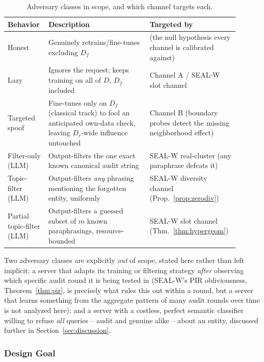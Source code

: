 \documentclass[10pt,journal,compsoc]{IEEEtran}
\begin{document}
\begin{table}[t]
\centering
\caption{Adversary classes in scope, and which channel targets each.}
\label{tab:threatmodel}
\begin{tabular}{@{}p{0.16\linewidth}p{0.42\linewidth}p{0.32\linewidth}@{}}
\toprule
Behavior & Description & Targeted by \\
\midrule
Honest & Genuinely retrains/fine-tunes excluding $D_f$ & (the null hypothesis every channel is calibrated against) \\
Lazy & Ignores the request; keeps training on all of $D$, $D_f$ included & Channel A / SEAL-W slot channel \\
Targeted spoof & Fine-tunes only on $D_f$ (classical track) to fool an anticipated own-data check, leaving $D_r$-wide influence untouched & Channel B (boundary probes detect the missing neighborhood effect) \\
Filter-only (LLM) & Output-filters the one exact known canonical audit string & SEAL-W real-cluster (any paraphrase defeats it) \\
Topic-filter (LLM) & Output-filters \emph{any} phrasing mentioning the forgotten entity, uniformly & SEAL-W diversity channel (Prop.~\ref{prop:zerodiv}) \\
Partial topic-filter (LLM) & Output-filters a guessed subset of $m$ known paraphrasings, resource-bounded & SEAL-W slot channel (Thm.~\ref{thm:hypergeom}) \\
\bottomrule
\end{tabular}
\end{table}

Two adversary classes are explicitly \emph{out} of scope, stated here rather than left implicit: a server that adapts its training or filtering strategy \emph{after} observing which specific audit round it is being tested in (SEAL-W's PIR obliviousness, Theorem~\ref{thm:pir}, is precisely what rules this out within a round, but a server that learns something from the aggregate pattern of many audit rounds over time is not analyzed here); and a server with a costless, perfect semantic classifier willing to refuse \emph{all} queries -- audit and genuine alike -- about an entity, discussed further in Section~\ref{sec:discussion}.

\subsubsection{Design Goal}
\end{document}
